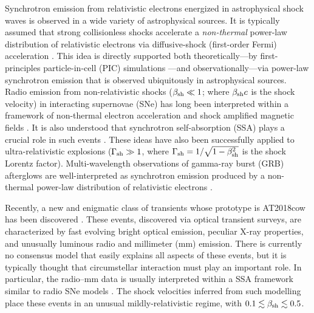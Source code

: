 \documentclass[twocolumn]{aastex63}
\begin{document}
Synchrotron emission from relativistic electrons energized in astrophysical shock waves is observed in a wide variety of astrophysical sources.   It is typically assumed that strong collisionless shocks accelerate a {\it non-thermal} power-law distribution of relativistic electrons via diffusive-shock (first-order Fermi) acceleration \citep{Bell78,Blandford&Ostriker78,BlandfordEichler87}. This idea is directly supported both theoretically---by first-principles particle-in-cell (PIC) simulations \citep[e.g.][]{Spitkovsky08,Sironi&Spitkovsky09,Sironi&Spitkovsky11,Park+15}---and observationally---via power-law synchrotron emission that is observed ubiquitously in astrophysical sources.
Radio emission from non-relativistic shocks ($\beta_{\rm sh} \ll 1$; where $\beta_{\rm sh} c$ is the shock velocity) in interacting supernovae (SNe) has long been interpreted within a framework of non-thermal electron acceleration and shock amplified magnetic fields \citep[e.g.][]{Chevalier82,Weiler+02}. 
It is also understood that synchrotron self-absorption (SSA) plays a crucial role in such events \citep{Chevalier98}.
These ideas have also been successfully applied to ultra-relativistic explosions ($\Gamma_{\rm sh} \gg 1$, where $\Gamma_{\rm sh} = 1/\sqrt{1-\beta_{\rm sh}^2}$ is the shock Lorentz factor). Multi-wavelength observations of gamma-ray burst (GRB) afterglows
are well-interpreted as synchrotron emission produced by a non-thermal power-law distribution of relativistic electrons \citep{Sari+98}.

Recently, a new and enigmatic class of transients whose prototype is AT2018cow has been discovered \citep{Prentice+18,Margutti+19,Ho+19,Ho+20,Coppejans+20,Perley+21,Ho+21b,Bright+21}.
These events, discovered via optical transient surveys, are characterized by fast evolving bright optical emission, peculiar X-ray properties, and unusually luminous radio and millimeter (mm) emission.
There is currently no consensus model that easily explains all aspects of these events, but it is typically thought that circumstellar interaction must play an important role.
In particular, the radio--mm data is usually interpreted within a SSA framework similar to radio SNe models \citep{Chevalier98}. The shock velocities inferred from such modelling place these events in an unusual mildly-relativistic regime, with $0.1 \lesssim \beta_{\rm sh} \lesssim 0.5$.
\end{document}
